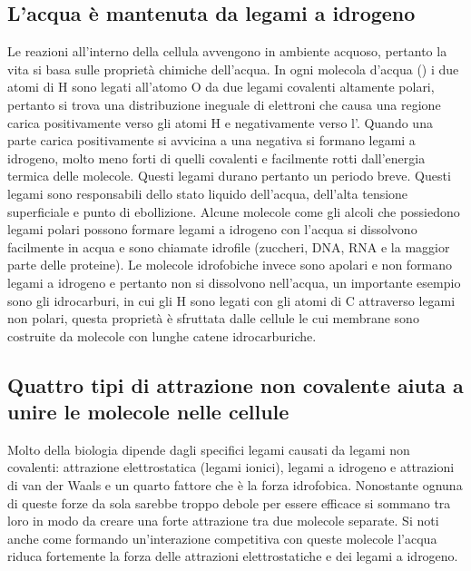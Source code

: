 \subsection{L'acqua \`e mantenuta da legami a idrogeno}
Le reazioni all'interno della cellula avvengono in ambiente acquoso, pertanto la vita si basa sulle propriet\`a chimiche dell'acqua. In ogni molecola d'acqua () i due atomi di 
H sono legati all'atomo O da due legami covalenti altamente polari, pertanto si trova una distribuzione ineguale di elettroni che causa una regione carica positivamente verso gli atomi H
e negativamente verso l'. Quando una parte carica positivamente si avvicina a una negativa si formano legami a idrogeno, molto meno forti di quelli covalenti e facilmente rotti 
dall'energia termica delle molecole. Questi legami durano pertanto un periodo breve. Questi legami sono responsabili dello stato liquido dell'acqua, dell'alta tensione superficiale e 
punto di ebollizione. Alcune molecole come gli alcoli che possiedono legami polari possono formare legami a idrogeno con l'acqua si dissolvono facilmente in acqua e sono chiamate 
idrofile (zuccheri, DNA, RNA e la maggior parte delle proteine). Le molecole idrofobiche invece sono apolari e non formano legami a idrogeno e pertanto non si dissolvono nell'acqua, un
importante esempio sono gli idrocarburi, in cui gli H sono legati con gli atomi di C attraverso legami non polari, questa propriet\`a \`e sfruttata dalle cellule le cui membrane sono 
costruite da molecole con lunghe catene idrocarburiche.
\subsection{Quattro tipi di attrazione non covalente aiuta a unire le molecole nelle cellule}
Molto della biologia dipende dagli specifici legami causati da legami non covalenti: attrazione elettrostatica (legami ionici), legami a idrogeno e attrazioni di van der Waals e un 
quarto fattore che \`e la forza idrofobica. Nonostante ognuna di queste forze da sola sarebbe troppo debole per essere efficace si sommano tra loro in modo da creare una forte attrazione
tra due molecole separate. Si noti anche come formando un'interazione competitiva con queste molecole l'acqua riduca fortemente la forza delle attrazioni elettrostatiche e dei legami a 
idrogeno.
